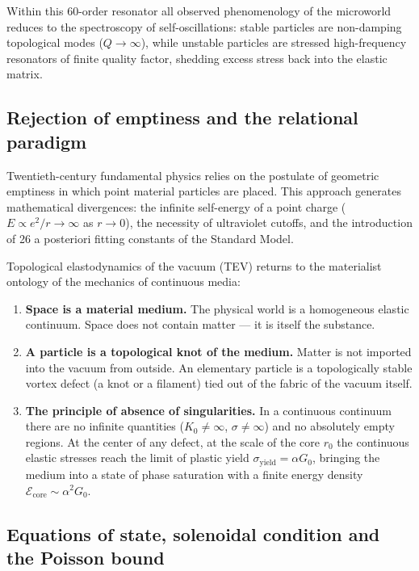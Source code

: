 \documentclass[11pt,a4paper]{article}
\theoremstyle{definition}
\theoremstyle{remark}
\begin{document}
Within this 60-order resonator all observed phenomenology of the microworld reduces to the spectroscopy of self-oscillations: stable particles are non-damping topological modes ($Q \to \infty$), while unstable particles are stressed high-frequency resonators of finite quality factor, shedding excess stress back into the elastic matrix.

\subsection{Rejection of emptiness and the relational paradigm}
Twentieth-century fundamental physics relies on the postulate of geometric emptiness in which point material particles are placed. This approach generates mathematical divergences: the infinite self-energy of a point charge ($E \propto e^2/r \to \infty$ as $r \to 0$), the necessity of ultraviolet cutoffs, and the introduction of 26 a posteriori fitting constants of the Standard Model.
	
Topological elastodynamics of the vacuum (TEV) returns to the materialist ontology of the mechanics of continuous media:
\begin{enumerate}
\item \textbf{Space is a material medium.} The physical world is a homogeneous elastic continuum. Space does not contain matter --- it is itself the substance.
\item \textbf{A particle is a topological knot of the medium.} Matter is not imported into the vacuum from outside. An elementary particle is a topologically stable vortex defect (a knot or a filament) tied out of the fabric of the vacuum itself.
\item \textbf{The principle of absence of singularities.} In a continuous continuum there are no infinite quantities ($K_0 \ne \infty$, $\sigma \ne \infty$) and no absolutely empty regions. At the center of any defect, at the scale of the core $r_0$ the continuous elastic stresses reach the limit of plastic yield $\sigma_{\mathrm{yield}} = \alpha G_0$, bringing the medium into a state of phase saturation with a finite energy density $\mathcal{E}_{\mathrm{core}} \sim \alpha^2 G_0$.
\end{enumerate}
	
\subsection{Equations of state, solenoidal condition and the Poisson bound}
	
\end{document}
